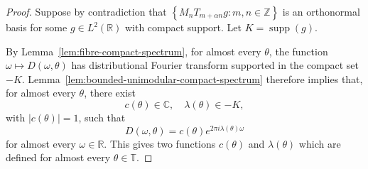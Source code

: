 \documentclass[reqno,a4paper,12pt]{amsart}
\numberwithin{equation}{section}
\def\R{{\mathbb R}}
\def\T{{\mathbb T}}
\def\C{{\mathbb C}}
\newcommand{\lt}{{L^2(\R)}}
\newcommand{\supp}{\operatorname{supp}}
\newcommand\1{\mathds{1}}
\begin{document}
\begin{proof}
Suppose by contradiction that $\left\{M_nT_{m+\alpha n}g:m,n\in\mathbb Z\right\}$ is an orthonormal basis for some $g \in \lt$ with compact support. Let $K = \supp(g)$.

By Lemma~\ref{lem:fibre-compact-spectrum}, for almost every $\theta$, the
function $\omega\mapsto D(\omega,\theta)$ has distributional Fourier transform
supported in the compact set $-K$. Lemma~\ref{lem:bounded-unimodular-compact-spectrum}
therefore implies that, for almost every $\theta$, there exist
$$
c(\theta)\in\C,
\quad
\lambda(\theta)\in -K,
$$
with $|c(\theta)|=1$, such that
\begin{equation}\label{eq:D-exponential-representation}
D(\omega,\theta)
=
c(\theta)e^{2\pi i\lambda(\theta)\omega}
\end{equation}
for almost every $\omega\in\R$. This gives two functions $c(\theta)$ and $\lambda(\theta)$ which are defined for almost every $\theta \in \T$.


\end{proof}
\end{document}
